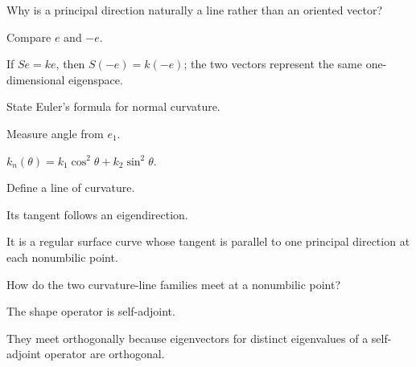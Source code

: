 \begin{exercise}\label{exr:vii42-02}
Why is a principal direction naturally a line rather than an oriented vector?
\end{exercise}

\begin{hint}
Compare \(e\) and \(-e\).
\end{hint}

\begin{solution}
If \(Se=ke\), then \(S(-e)=k(-e)\); the two vectors represent the same one-dimensional eigenspace.
\end{solution}

\begin{exercise}\label{exr:vii42-03}
State Euler's formula for normal curvature.
\end{exercise}

\begin{hint}
Measure angle from \(e_1\).
\end{hint}

\begin{solution}
\(k_n(\theta)=k_1\cos^2\theta+k_2\sin^2\theta\).
\end{solution}

\begin{exercise}\label{exr:vii42-04}
Define a line of curvature.
\end{exercise}

\begin{hint}
Its tangent follows an eigendirection.
\end{hint}

\begin{solution}
It is a regular surface curve whose tangent is parallel to one principal direction at each nonumbilic point.
\end{solution}

\begin{exercise}\label{exr:vii42-05}
How do the two curvature-line families meet at a nonumbilic point?
\end{exercise}

\begin{hint}
The shape operator is self-adjoint.
\end{hint}

\begin{solution}
They meet orthogonally because eigenvectors for distinct eigenvalues of a self-adjoint operator are orthogonal.
\end{solution}

